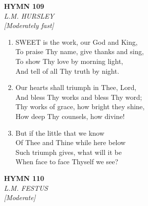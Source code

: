 \newpage
\begin{center}
    {\Large \textbf{HYMN 109}}
    \\
    \textit{L.M. HURSLEY}
    \\
    \textit{\small [Moderately fast]}
\end{center}
\vspace{1em}

\begin{enumerate}
    \item SWEET is the work, our God and King, \\
        To praise Thy name, give thanks and sing, \\
        To show Thy love by morning light, \\
        And tell of all Thy truth by night.

    \item Our hearts shall triumph in Thee, Lord, \\
        And bless Thy works and bless Thy word; \\
        Thy works of grace, how bright they shine, \\
        How deep Thy counsels, how divine!

    \item But if the little that we know \\
        Of Thee and Thine while here below \\
        Such triumph gives, what will it be \\
        When face to face Thyself we see?

\end{enumerate}

\newpage
\begin{center}
    {\Large \textbf{HYMN 110}}
    \\
    \textit{L.M. FESTUS}
    \\
    \textit{\small [Moderate]}
\end{center}
\vspace{1em}

